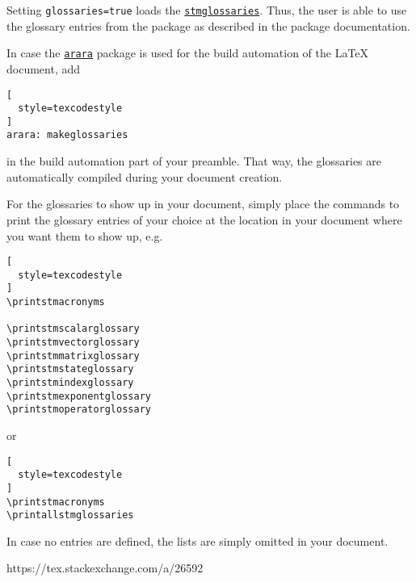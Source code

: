 \documentclass[%
  type=article,%
  layout=koma,%
  page=false,%
  hyperref=true,%
  cleveref=true,%
  conditionallox=true,%
  conditionalloxnewpage=true,%
  date=true,%
  glossaries=true,%
  index=true,%
  listings=true%
]{stmtext}
\newcommand{\stmlatexpackagelink}[1]{\href{https://github.com/raedma/stmlatex/blob/master/doc/#1/#1.pdf}{\texttt{#1}}}
\newcommand{\ctanpackagelink}[1]{\href{https://ctan.org/pkg/#1}{\texttt{#1}}}
\begin{document}
Setting \texttt{glossaries=true} loads the \stmlatexpackagelink{stmglossaries}. Thus, the user is able to use the glossary entries from the package as described in the package documentation.

In case the \ctanpackagelink{arara} package is used for the build automation of the \LaTeX{} document, add
\begin{lstlisting}[
  style=texcodestyle
]
arara: makeglossaries
\end{lstlisting}

in the build automation part of your preamble. That way, the glossaries are automatically compiled during your document creation.

For the glossaries to show up in your document, simply place the commands to print the glossary entries of your choice at the location in your document where you want them to show up, e.g.

\begin{lstlisting}[
  style=texcodestyle
]
\printstmacronyms

\printstmscalarglossary
\printstmvectorglossary
\printstmmatrixglossary
\printstmstateglossary
\printstmindexglossary
\printstmexponentglossary
\printstmoperatorglossary
\end{lstlisting}

or

\begin{lstlisting}[
  style=texcodestyle
]
\printstmacronyms
\printallstmglossaries
\end{lstlisting}

In case no entries are defined, the lists are simply omitted in your document.%



\label{sec:options:hyperref}

https://tex.stackexchange.com/a/26592


\label{sec:options:layout}


\end{document}
